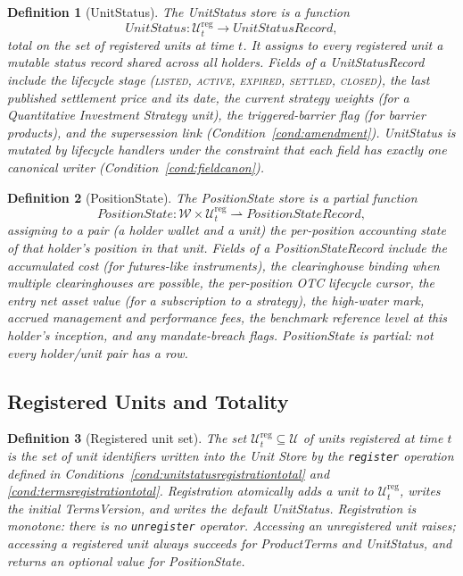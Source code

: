 \documentclass[11pt,a4paper]{article}
\newtheorem{definition}{Definition}[section]
\begin{document}
\begin{definition}[UnitStatus]
\label{def:unitstatus}
The \emph{UnitStatus} store is a function
\[
\textit{UnitStatus} : \mathcal{U}_t^{\mathrm{reg}} \to \textit{UnitStatusRecord},
\]
total on the set of registered units at time $t$. It assigns to every registered unit a mutable status record shared across all holders. Fields of a \textit{UnitStatusRecord} include the lifecycle stage (\textsc{listed}, \textsc{active}, \textsc{expired}, \textsc{settled}, \textsc{closed}), the last published settlement price and its date, the current strategy weights (for a Quantitative Investment Strategy unit), the triggered-barrier flag (for barrier products), and the supersession link (Condition~\ref{cond:amendment}). \textit{UnitStatus} is mutated by lifecycle handlers under the constraint that each field has exactly one canonical writer (Condition~\ref{cond:fieldcanon}).
\end{definition}

\begin{definition}[PositionState]
\label{def:positionstate}
The \emph{PositionState} store is a partial function
\[
\textit{PositionState} : \mathcal{W} \times \mathcal{U}_t^{\mathrm{reg}} \rightharpoonup \textit{PositionStateRecord},
\]
assigning to a pair (a holder wallet and a unit) the per-position accounting state of that holder's position in that unit. Fields of a \textit{PositionStateRecord} include the accumulated cost (for futures-like instruments), the clearinghouse binding when multiple clearinghouses are possible, the per-position OTC lifecycle cursor, the entry net asset value (for a subscription to a strategy), the high-water mark, accrued management and performance fees, the benchmark reference level at this holder's inception, and any mandate-breach flags. \textit{PositionState} is partial: not every holder/unit pair has a row.
\end{definition}

\subsection{Registered Units and Totality}

\begin{definition}[Registered unit set]
\label{def:registered}
The set $\mathcal{U}_t^{\mathrm{reg}} \subseteq \mathcal{U}$ of units registered at time $t$ is the set of unit identifiers written into the Unit Store by the \texttt{register} operation defined in Conditions~\ref{cond:unitstatusregistrationtotal} and \ref{cond:termsregistrationtotal}. Registration atomically adds a unit to $\mathcal{U}_t^{\mathrm{reg}}$, writes the initial \textit{TermsVersion}, and writes the default \textit{UnitStatus}. Registration is monotone: there is no \texttt{unregister} operator. Accessing an unregistered unit raises; accessing a registered unit always succeeds for \textit{ProductTerms} and \textit{UnitStatus}, and returns an optional value for \textit{PositionState}.
\end{definition}
\end{document}
